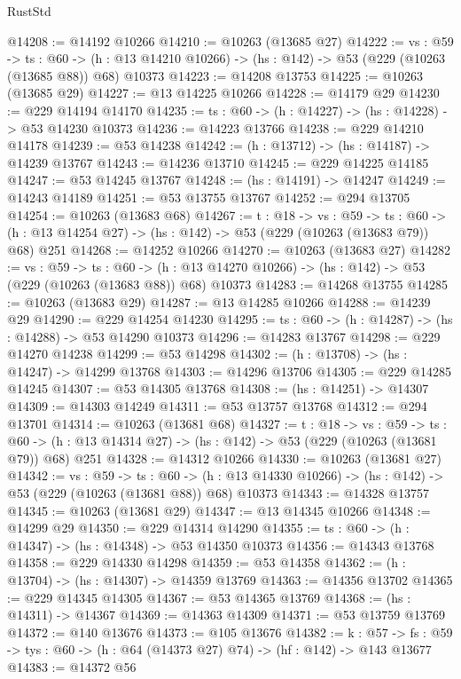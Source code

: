 \begin{lexlean}{RustStd}
\begin{coremodule}
@14208 := @14192 @10266
@14210 := @10263 (@13685 @27)
@14222 := {vs : @59} ->
  {ts : @60} ->
  (h : @13 @14210 @10266) -> (hs : @142) -> @53 (@229 (@10263 (@13685 @88)) @68) @10373
@14223 := @14208 @13753
@14225 := @10263 (@13685 @29)
@14227 := @13 @14225 @10266
@14228 := @14179 @29
@14230 := @229 @14194 @14170
@14235 := {ts : @60} -> (h : @14227) -> (hs : @14228) -> @53 @14230 @10373
@14236 := @14223 @13766
@14238 := @229 @14210 @14178
@14239 := @53 @14238
@14242 := (h : @13712) -> (hs : @14187) -> @14239 @13767
@14243 := @14236 @13710
@14245 := @229 @14225 @14185
@14247 := @53 @14245 @13767
@14248 := (hs : @14191) -> @14247
@14249 := @14243 @14189
@14251 := @53 @13755 @13767
@14252 := @294 @13705
@14254 := @10263 (@13683 @68)
@14267 := {t : @18} ->
  {vs : @59} ->
  {ts : @60} -> (h : @13 @14254 @27) -> (hs : @142) -> @53 (@229 (@10263 (@13683 @79)) @68) @251
@14268 := @14252 @10266
@14270 := @10263 (@13683 @27)
@14282 := {vs : @59} ->
  {ts : @60} ->
  (h : @13 @14270 @10266) -> (hs : @142) -> @53 (@229 (@10263 (@13683 @88)) @68) @10373
@14283 := @14268 @13755
@14285 := @10263 (@13683 @29)
@14287 := @13 @14285 @10266
@14288 := @14239 @29
@14290 := @229 @14254 @14230
@14295 := {ts : @60} -> (h : @14287) -> (hs : @14288) -> @53 @14290 @10373
@14296 := @14283 @13767
@14298 := @229 @14270 @14238
@14299 := @53 @14298
@14302 := (h : @13708) -> (hs : @14247) -> @14299 @13768
@14303 := @14296 @13706
@14305 := @229 @14285 @14245
@14307 := @53 @14305 @13768
@14308 := (hs : @14251) -> @14307
@14309 := @14303 @14249
@14311 := @53 @13757 @13768
@14312 := @294 @13701
@14314 := @10263 (@13681 @68)
@14327 := {t : @18} ->
  {vs : @59} ->
  {ts : @60} -> (h : @13 @14314 @27) -> (hs : @142) -> @53 (@229 (@10263 (@13681 @79)) @68) @251
@14328 := @14312 @10266
@14330 := @10263 (@13681 @27)
@14342 := {vs : @59} ->
  {ts : @60} ->
  (h : @13 @14330 @10266) -> (hs : @142) -> @53 (@229 (@10263 (@13681 @88)) @68) @10373
@14343 := @14328 @13757
@14345 := @10263 (@13681 @29)
@14347 := @13 @14345 @10266
@14348 := @14299 @29
@14350 := @229 @14314 @14290
@14355 := {ts : @60} -> (h : @14347) -> (hs : @14348) -> @53 @14350 @10373
@14356 := @14343 @13768
@14358 := @229 @14330 @14298
@14359 := @53 @14358
@14362 := (h : @13704) -> (hs : @14307) -> @14359 @13769
@14363 := @14356 @13702
@14365 := @229 @14345 @14305
@14367 := @53 @14365 @13769
@14368 := (hs : @14311) -> @14367
@14369 := @14363 @14309
@14371 := @53 @13759 @13769
@14372 := @140 @13676
@14373 := @105 @13676
@14382 := {k : @57} ->
  {fs : @59} -> {tys : @60} -> (h : @64 (@14373 @27) @74) -> (hf : @142) -> @143 @13677
@14383 := @14372 @56

\end{coremodule}
\end{lexlean}
